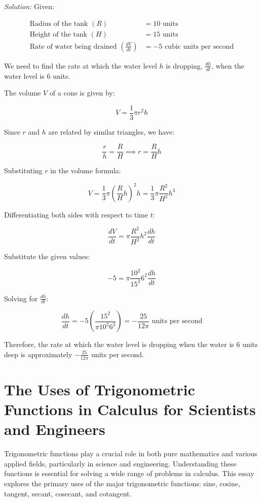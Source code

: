 \documentclass[a4paper,12pt]{book}
\newcounter{problem}
\newenvironment{solution}[1][]
{\par\noindent\textit{Solution:} \rmfamily}{\medskip}
\begin{document}
\begin{solution}
Given:

\begin{align*}
\text{Radius of the tank } (R) &= 10 \text{ units} \\
\text{Height of the tank } (H) &= 15 \text{ units} \\
\text{Rate of water being drained } \left(\frac{dV}{dt}\right) &= -5 \text{ cubic units per second}
\end{align*}

We need to find the rate at which the water level \(h\) is dropping, \(\frac{dh}{dt}\), when the water level is \(6\) units.

The volume \(V\) of a cone is given by:

\[
V = \frac{1}{3}\pi r^2 h
\]

Since \(r\) and \(h\) are related by similar triangles, we have:

\[
\frac{r}{h} = \frac{R}{H} \implies r = \frac{R}{H} h
\]

Substituting \(r\) in the volume formula:

\[
V = \frac{1}{3}\pi \left(\frac{R}{H} h\right)^2 h = \frac{1}{3}\pi \frac{R^2}{H^2} h^3
\]

Differentiating both sides with respect to time \(t\):

\[
\frac{dV}{dt} = \pi \frac{R^2}{H^2} h^2 \frac{dh}{dt}
\]

Substitute the given values:

\[
-5 = \pi \frac{10^2}{15^2} 6^2 \frac{dh}{dt}
\]

Solving for \(\frac{dh}{dt}\):

\[
\frac{dh}{dt} = -5 \left(\frac{15^2}{\pi 10^2 6^2}\right) = -\frac{25}{12\pi} \text{ units per second}
\]

Therefore, the rate at which the water level is dropping when the water is \(6\) units deep is approximately \(-\frac{25}{12\pi}\) units per second.
\end{solution}






\section{The Uses of Trigonometric Functions in Calculus for Scientists and Engineers}
Trigonometric functions play a crucial role in both pure mathematics and various applied fields, particularly in science and engineering. Understanding these functions is essential for solving a wide range of problems in calculus. This essay explores the primary uses of the major trigonometric functions: sine, cosine, tangent, secant, cosecant, and cotangent.
\end{document}
